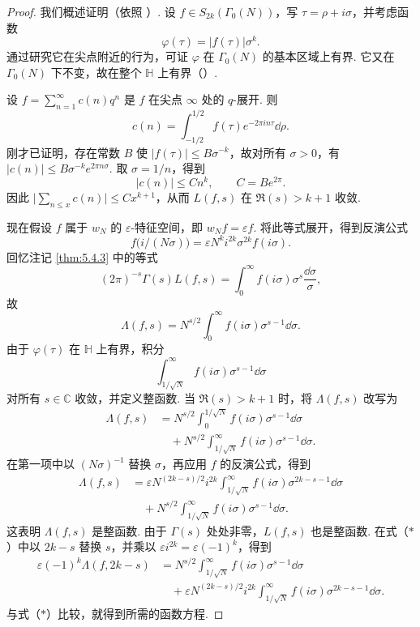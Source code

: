 \begin{proof}
我们概述证明（依照 \cite[Theorem 9.8]{knapp1992}）. 设 $f\in S_{2k}(\Gamma_0(N))$，写 $\tau=\rho+i\sigma$，并考虑函数
\[
\varphi(\tau)=|f(\tau)|\sigma^k.
\]
通过研究它在尖点附近的行为，可证 $\varphi$ 在 $\Gamma_0(N)$ 的基本区域上有界. 它又在 $\Gamma_0(N)$ 下不变，故在整个 $\mathbb{H}$ 上有界（\cite[Lemma 9.6]{knapp1992}）.

设 $f=\sum_{n=1}^{\infty}c(n)q^n$ 是 $f$ 在尖点 $\infty$ 处的 $q$-展开. 则
\[
c(n)=\int_{-1/2}^{1/2}f(\tau)e^{-2\pi in\tau}\dd\rho.
\]
刚才已证明，存在常数 $B$ 使 $|f(\tau)|\le B\sigma^{-k}$，故对所有 $\sigma>0$，有 $|c(n)|\le B\sigma^{-k}e^{2\pi n\sigma}$. 取 $\sigma=1/n$，得到
\[
|c(n)|\le Cn^k,\qquad C=Be^{2\pi}.
\]
因此 $\bigl|\sum_{n\le x}c(n)\bigr|\le Cx^{k+1}$，从而 $L(f,s)$ 在 $\Re(s)>k+1$ 收敛.

现在假设 $f$ 属于 $w_N$ 的 $\varepsilon$-特征空间，即 $w_Nf=\varepsilon f$. 将此等式展开，得到反演公式
\[
f\bigl(i/(N\sigma)\bigr)=\varepsilon N^ki^{2k}\sigma^{2k}f(i\sigma).
\]
回忆注记 \ref{thm:5.4.3} 中的等式
\[
(2\pi)^{-s}\Gamma(s)L(f,s)=\int_0^{\infty}f(i\sigma)\sigma^s\frac{\dd\sigma}{\sigma},
\]
故
\[
\Lambda(f,s)=N^{s/2}\int_0^{\infty}f(i\sigma)\sigma^{s-1}\dd\sigma.
\]
由于 $\varphi(\tau)$ 在 $\mathbb{H}$ 上有界，积分
\[
\int_{1/\sqrt{N}}^{\infty}f(i\sigma)\sigma^{s-1}\dd\sigma
\]
对所有 $s\in\mathbb{C}$ 收敛，并定义整函数. 当 $\Re(s)>k+1$ 时，将 $\Lambda(f,s)$ 改写为
\begin{align*}
\Lambda(f,s)
&=N^{s/2}\int_0^{1/\sqrt{N}}f(i\sigma)\sigma^{s-1}\dd\sigma\\
&\quad+N^{s/2}\int_{1/\sqrt{N}}^{\infty}f(i\sigma)\sigma^{s-1}\dd\sigma.
\end{align*}
在第一项中以 $(N\sigma)^{-1}$ 替换 $\sigma$，再应用 $f$ 的反演公式，得到
\begin{align*}
\Lambda(f,s)
&=\varepsilon N^{(2k-s)/2}i^{2k}
\int_{1/\sqrt{N}}^{\infty}f(i\sigma)\sigma^{2k-s-1}\dd\sigma\\
&\quad+N^{s/2}\int_{1/\sqrt{N}}^{\infty}f(i\sigma)\sigma^{s-1}\dd\sigma.\tag{$*$}
\end{align*}
这表明 $\Lambda(f,s)$ 是整函数. 由于 $\Gamma(s)$ 处处非零，$L(f,s)$ 也是整函数. 在式（$*$）中以 $2k-s$ 替换 $s$，并乘以 $\varepsilon i^{2k}=\varepsilon(-1)^k$，得到
\begin{align*}
\varepsilon(-1)^k\Lambda(f,2k-s)
&=N^{s/2}\int_{1/\sqrt{N}}^{\infty}f(i\sigma)\sigma^{s-1}\dd\sigma\\
&\quad+\varepsilon N^{(2k-s)/2}i^{2k}
\int_{1/\sqrt{N}}^{\infty}f(i\sigma)\sigma^{2k-s-1}\dd\sigma.
\end{align*}
与式（$*$）比较，就得到所需的函数方程.
\end{proof}

